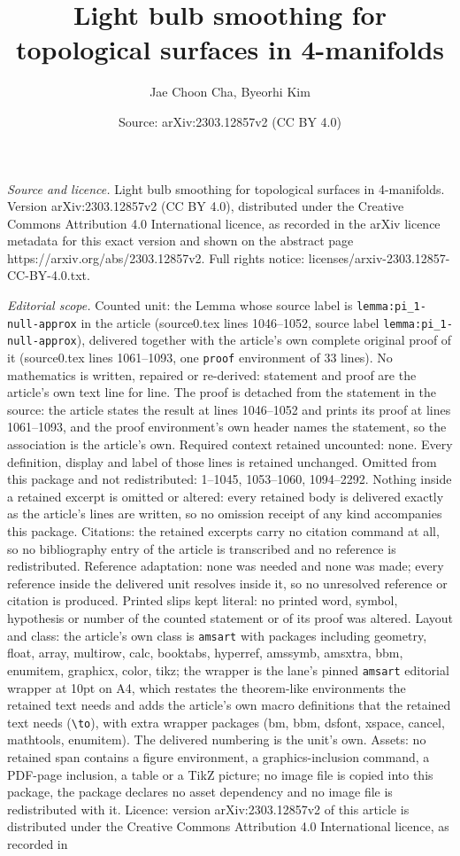 \documentclass[10pt,a4paper]{amsart}
\title[Light bulb smoothing for topological surfaces in 4-manifolds]{Light bulb smoothing for topological surfaces in 4-manifolds}
\author{Jae Choon Cha, Byeorhi Kim}
\date{Source: arXiv:2303.12857v2 (CC BY 4.0)}
\begin{document}
\maketitle

\noindent\emph{Source and licence.} Light bulb smoothing for topological surfaces in 4-manifolds. Version arXiv:2303.12857v2 (CC BY 4.0), distributed under the Creative Commons Attribution 4.0 International licence, as recorded in the arXiv licence metadata for this exact version and shown on the abstract page https://arxiv.org/abs/2303.12857v2. Full rights notice: licenses/arxiv-2303.12857-CC-BY-4.0.txt.\par\smallskip

\noindent\textit{Editorial scope.} Counted unit: the Lemma whose source label is \texttt{lemma:pi\_1-null-approx} in the article (source0.tex lines 1046--1052, source label \texttt{lemma:pi\_1-null-approx}), delivered together with the article's own complete original proof of it (source0.tex lines 1061--1093, one \texttt{proof} environment of 33 lines). No mathematics is written, repaired or re-derived: statement and proof are the article's own text line for line. The proof is detached from the statement in the source: the article states the result at lines 1046--1052 and prints its proof at lines 1061--1093, and the proof environment's own header names the statement, so the association is the article's own. Required context retained uncounted: none. Every definition, display and label of those lines is retained unchanged. Omitted from this package and not redistributed: 1--1045, 1053--1060, 1094--2292. Nothing inside a retained excerpt is omitted or altered: every retained body is delivered exactly as the article's lines are written, so no omission receipt of any kind accompanies this package. Citations: the retained excerpts carry no citation command at all, so no bibliography entry of the article is transcribed and no reference is redistributed. Reference adaptation: none was needed and none was made; every reference inside the delivered unit resolves inside it, so no unresolved reference or citation is produced. Printed slips kept literal: no printed word, symbol, hypothesis or number of the counted statement or of its proof was altered. Layout and class: the article's own class is \texttt{amsart} with packages including geometry, float, array, multirow, calc, booktabs, hyperref, amssymb, amsxtra, bbm, enumitem, graphicx, color, tikz; the wrapper is the lane's pinned \texttt{amsart} editorial wrapper at 10pt on A4, which restates the theorem-like environments the retained text needs and adds the article's own macro definitions that the retained text needs (\texttt{\textbackslash to}), with extra wrapper packages (bm, bbm, dsfont, xspace, cancel, mathtools, enumitem). The delivered numbering is the unit's own. Assets: no retained span contains a figure environment, a graphics-inclusion command, a PDF-page inclusion, a table or a TikZ picture; no image file is copied into this package, the package declares no asset dependency and no image file is redistributed with it. Licence: version arXiv:2303.12857v2 of this article is distributed under the Creative Commons Attribution 4.0 International licence, as recorded in 
\end{document}
